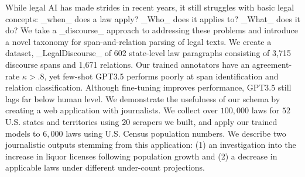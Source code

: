 While legal AI has made strides in recent years, it still struggles with basic legal concepts: \_when\_ does a law apply? \_Who\_ does it applies to? \_What\_ does it do? We take a \_discourse\_ approach to addressing these problems and introduce a novel taxonomy for span-and-relation parsing of legal texts. We create a dataset, \_LegalDiscourse\_ of 602 state-level law paragraphs consisting of 3,715 discourse spans and 1,671 relations. Our trained annotators have an agreement-rate $\kappa>.8$, yet few-shot GPT3.5 performs poorly at span identification and relation classification. Although fine-tuning improves performance, GPT3.5 still lags far below human level. We demonstrate the usefulness of our schema by creating a web application with journalists. We collect over $100,000$ laws for $52$ U.S. states and territories using $20$ scrapers we built, and apply our trained models to $6,000$ laws using U.S. Census population numbers. We describe two journalistic outputs stemming from this application: (1) an investigation into the increase in liquor licenses following population growth and (2) a decrease in applicable laws under different under-count projections.
